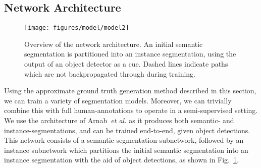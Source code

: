\documentclass[runningheads]{llncs}
\def\etal{\emph{et al.} }
\begin{document}
\subsection{Network Architecture}
\label{sec:model}
\begin{figure}[t]
\centering
\texttt{[image: figures/model/model2]}
\caption{Overview of the network architecture. An initial semantic segmentation is partitioned into an instance segmentation, using the output of an object detector as a cue. Dashed lines indicate paths which are not backpropagated through during training.}
\label{fig:model}
\end{figure} Using the approximate ground truth generation method described in this section, we can train a variety of segmentation models.
Moreover, we can trivially combine this with full human-annotations to operate in a semi-supervised setting.
We use the architecture of Arnab~\etal\cite{arnab_cvpr_2017} as it produces both semantic- and instance-segmentations, and can be trained end-to-end, given object detections.
This network consists of a semantic segmentation subnetwork, followed by an instance subnetwork which partitions the initial semantic segmentation into an instance segmentation with the aid of object detections, as shown in Fig.~\ref{fig:model}.
\end{document}
